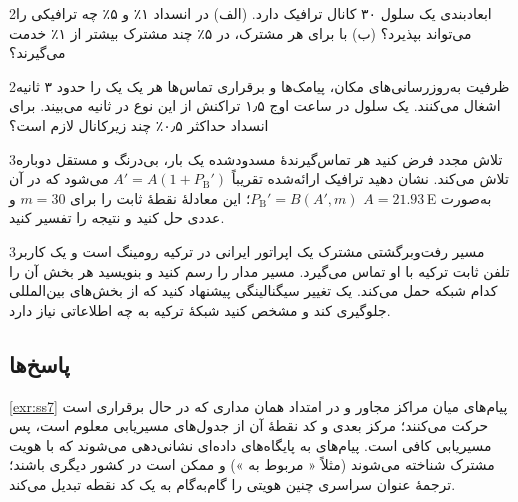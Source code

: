 \documentclass[11pt,a4paper]{article}
\begin{document}
\begin{exercisebox}{2}{ابعادبندی}\label{exr:dim}
یک سلول ۳۰ کانال ترافیک دارد. (الف) در انسداد ۱٪ و ۵٪ چه ترافیکی را می‌تواند بپذیرد؟
(ب) با  برای هر مشترک، در ۵٪ چند مشترک بیشتر از ۱٪ خدمت می‌گیرند؟
\end{exercisebox}

\begin{exercisebox}{2}{ظرفیت }\label{exr:sdcch}
به‌روزرسانی‌های مکان، پیامک‌ها و برقراری تماس‌ها هر یک یک  را حدود ۳ ثانیه اشغال
می‌کنند. یک سلول در ساعت اوج ۱٫۵ تراکنش از این نوع در ثانیه می‌بیند. برای انسداد حداکثر
۰٫۵٪ چند زیرکانال  لازم است؟
\end{exercisebox}

\begin{exercisebox}{3}{تلاش مجدد}\label{exr:retry}
فرض کنید هر تماس‌گیرندهٔ مسدودشده یک بار، بی‌درنگ و مستقل دوباره تلاش می‌کند. نشان دهید
ترافیک ارائه‌شده تقریباً $A' = A(1+P_{\mathrm{B}}')$ می‌شود که در آن
$P_{\mathrm{B}}' = B(A',m)$؛ این معادلهٔ نقطهٔ ثابت را برای $m = 30$ و $A = 21.93$\,E به‌صورت
عددی حل کنید و نتیجه را تفسیر کنید.
\end{exercisebox}

\begin{exercisebox}{3}{مسیر رفت‌وبرگشتی}\label{exr:trombone}
مشترک یک اپراتور ایرانی در ترکیه رومینگ است و یک کاربر تلفن ثابت ترکیه با او تماس می‌گیرد.
مسیر مدار را رسم کنید و بنویسید هر بخش آن را کدام شبکه حمل می‌کند. یک تغییر سیگنالینگی
پیشنهاد کنید که از بخش‌های بین‌المللی جلوگیری کند و مشخص کنید شبکهٔ ترکیه به چه اطلاعاتی
نیاز دارد.
\end{exercisebox}

\subsection*{پاسخ‌ها}

\begin{solutionbox}{\ref{exr:ss7}}
پیام‌های  میان مراکز مجاور و در امتداد همان مداری که در حال برقراری است حرکت می‌کنند؛
مرکز بعدی و کد نقطهٔ آن از جدول‌های مسیریابی معلوم است، پس مسیریابی  کافی است. پیام‌های
 به پایگاه‌های داده‌ای نشانی‌دهی می‌شوند که با هویت مشترک شناخته می‌شوند (مثلاً «
مربوط به ») و ممکن است در کشور دیگری باشند؛ ترجمهٔ عنوان سراسری 
چنین هویتی را گام‌به‌گام به یک کد نقطه تبدیل می‌کند.
\end{solutionbox}
\end{document}
